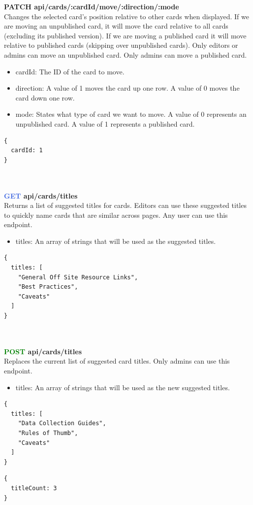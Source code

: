 \documentclass[onecolumn, draftclsnofoot,10pt, compsoc, usenames, dvipsnames]{IEEEtran}
\begin{document}
\noindent
\textbf{\textcolor{BlueGreen}{PATCH} api/cards/:cardId/move/:direction/:mode} \\
Changes the selected card's position relative to other cards when displayed. If we are moving an unpublished card, it will move the card relative to all cards (excluding its published version). If we are moving a published card it will move relative to published cards (skipping over unpublished cards). Only editors or admins can move an unpublished card. Only admins can move a published card.
\begin{itemize}
    \item cardId: The ID of the card to move.
    \item direction: A value of 1 moves the card up one row. A value of 0 moves the card down one row.
    \item mode: States what type of card we want to move. A value of 0 represents an unpublished card. A value of 1 represents a published card.
\end{itemize}
\begin{lstlisting}[caption=Example Response]
{ 
  cardId: 1
}
\end{lstlisting}
\\~\\


\noindent
\textbf{\textcolor{RoyalBlue}{GET} api/cards/titles} \\
Returns a list of suggested titles for cards. Editors can use these suggested titles to quickly name cards that are similar across pages. Any user can use this endpoint.
\begin{itemize}
    \item titles: An array of strings that will be used as the suggested titles.
\end{itemize}
\begin{lstlisting}[caption=Example Response]
{ 
  titles: [
    "General Off Site Resource Links",
    "Best Practices",
    "Caveats"
  ]
}
\end{lstlisting}
\\~\\


\noindent
\textbf{\textcolor{Green}{POST} api/cards/titles} \\
Replaces the current list of suggested card titles. Only admins can use this endpoint.
\begin{itemize}
    \item titles: An array of strings that will be used as the new suggested titles.
\end{itemize}
\begin{lstlisting}[caption=Example Request Body]
{ 
  titles: [
    "Data Collection Guides",
    "Rules of Thumb",
    "Caveats"
  ]
}
\end{lstlisting}
\begin{lstlisting}[caption=Example Response]
{ 
  titleCount: 3
}
\end{lstlisting}
\\~\\
\end{document}

